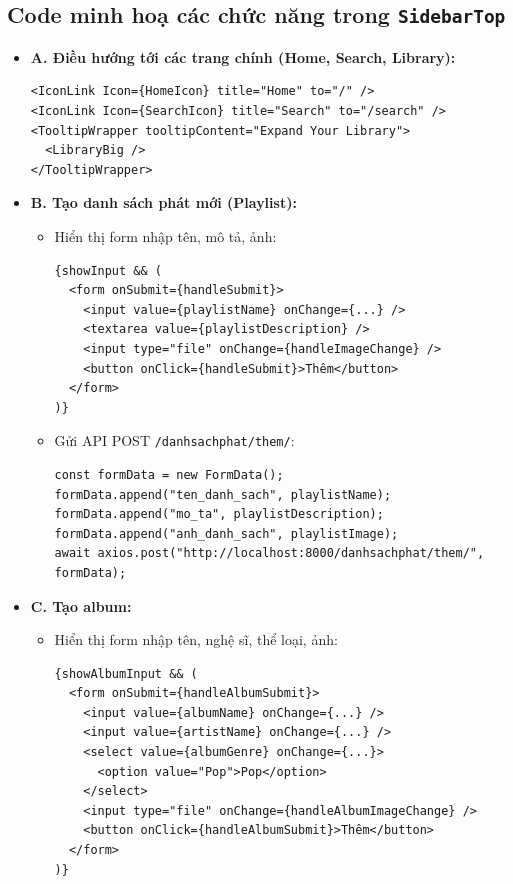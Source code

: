 \begin{itemize}
  \subsection*{Code minh hoạ các chức năng trong \texttt{SidebarTop}}

\begin{itemize}
  \item \textbf{A. Điều hướng tới các trang chính (Home, Search, Library):}
  \begin{verbatim}
<IconLink Icon={HomeIcon} title="Home" to="/" />
<IconLink Icon={SearchIcon} title="Search" to="/search" />
<TooltipWrapper tooltipContent="Expand Your Library">
  <LibraryBig />
</TooltipWrapper>
  \end{verbatim}

  \item \textbf{B. Tạo danh sách phát mới (Playlist):}
  \begin{itemize}
    \item Hiển thị form nhập tên, mô tả, ảnh:
\begin{verbatim}
{showInput && (
  <form onSubmit={handleSubmit}>
    <input value={playlistName} onChange={...} />
    <textarea value={playlistDescription} />
    <input type="file" onChange={handleImageChange} />
    <button onClick={handleSubmit}>Thêm</button>
  </form>
)}
\end{verbatim}

    \item Gửi API POST \texttt{/danhsachphat/them/}:
\begin{verbatim}
const formData = new FormData();
formData.append("ten_danh_sach", playlistName);
formData.append("mo_ta", playlistDescription);
formData.append("anh_danh_sach", playlistImage);
await axios.post("http://localhost:8000/danhsachphat/them/", formData);
\end{verbatim}
  \end{itemize}

  \item \textbf{C. Tạo album:}
  \begin{itemize}
    \item Hiển thị form nhập tên, nghệ sĩ, thể loại, ảnh:
\begin{verbatim}
{showAlbumInput && (
  <form onSubmit={handleAlbumSubmit}>
    <input value={albumName} onChange={...} />
    <input value={artistName} onChange={...} />
    <select value={albumGenre} onChange={...}>
      <option value="Pop">Pop</option>
    </select>
    <input type="file" onChange={handleAlbumImageChange} />
    <button onClick={handleAlbumSubmit}>Thêm</button>
  </form>
)}
\end{verbatim}


\end{itemize}
\end{itemize}
\end{itemize}
